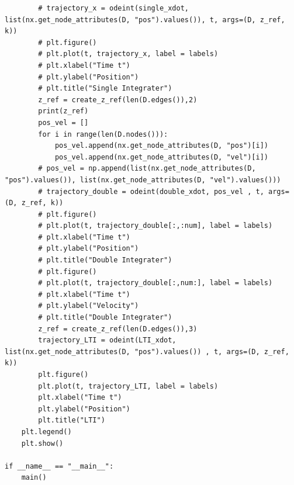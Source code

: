 \documentclass{article}
\begin{document}
\begin{verbatim}
        # trajectory_x = odeint(single_xdot, list(nx.get_node_attributes(D, "pos").values()), t, args=(D, z_ref, k))
        # plt.figure()
        # plt.plot(t, trajectory_x, label = labels)
        # plt.xlabel("Time t")
        # plt.ylabel("Position")
        # plt.title("Single Integrater")
        z_ref = create_z_ref(len(D.edges()),2)
        print(z_ref)
        pos_vel = []
        for i in range(len(D.nodes())):
            pos_vel.append(nx.get_node_attributes(D, "pos")[i])
            pos_vel.append(nx.get_node_attributes(D, "vel")[i])
        # pos_vel = np.append(list(nx.get_node_attributes(D, "pos").values()), list(nx.get_node_attributes(D, "vel").values()))
        # trajectory_double = odeint(double_xdot, pos_vel , t, args=(D, z_ref, k))
        # plt.figure()
        # plt.plot(t, trajectory_double[:,:num], label = labels)
        # plt.xlabel("Time t")
        # plt.ylabel("Position")
        # plt.title("Double Integrater")
        # plt.figure()
        # plt.plot(t, trajectory_double[:,num:], label = labels)
        # plt.xlabel("Time t")
        # plt.ylabel("Velocity")
        # plt.title("Double Integrater")
        z_ref = create_z_ref(len(D.edges()),3)
        trajectory_LTI = odeint(LTI_xdot, list(nx.get_node_attributes(D, "pos").values()) , t, args=(D, z_ref, k))
        plt.figure()
        plt.plot(t, trajectory_LTI, label = labels)
        plt.xlabel("Time t")
        plt.ylabel("Position")
        plt.title("LTI")
    plt.legend()
    plt.show()

if __name__ == "__main__":
    main()
\end{verbatim}
\end{document}
